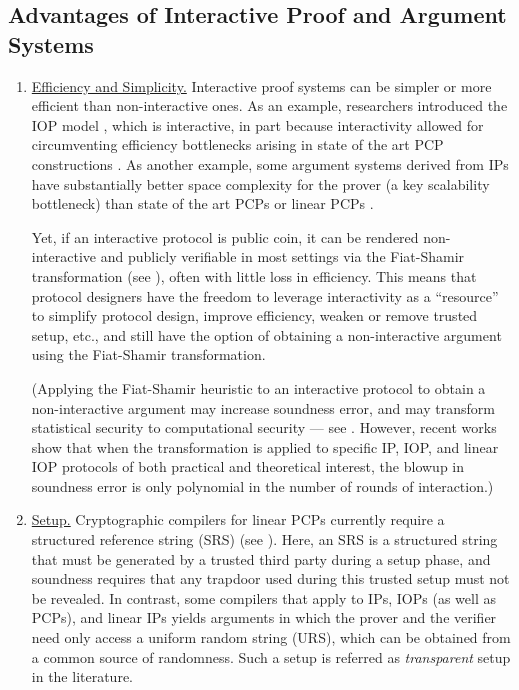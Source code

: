 \subsection{Advantages of Interactive Proof and Argument Systems}
\label{sec:paradigms:interactivity:advantages}
\begin{enumerate}[label=\alph*.]
\item \underline{Efficiency and Simplicity.} 
Interactive proof systems can be simpler or more efficient than non-interactive ones.
As an example, researchers introduced the IOP model \cite{2016:tcc:IOPs, 2016:stoc:Constant-round-Interactive-Proofs-for-Delegating-Computation}, which is interactive, in part because interactivity allowed for circumventing efficiency bottlenecks arising
in state of the art PCP constructions \cite{2013:STOC:concrete-efficiency-PCPs}. 
As another example, some argument systems derived from IPs \cite{2018:SP:Doubly-efficient-zkSNARKs-without-trusted-setup, 2019:crypto:libra}
have substantially better space complexity for the prover (a key scalability bottleneck) than state of the art PCPs \cite{2013:STOC:concrete-efficiency-PCPs} or linear PCPs \cite{2013:QSPs-and-succinct-NIZKs-without-PCPs, 2016:Eurocrypt:On-the-Size-of-Pairing-Based-Non-interactive-Arguments}. 

Yet, if an interactive protocol is public coin, it can be rendered non-interactive and publicly verifiable in most settings via the Fiat-Shamir transformation (see ), often with little loss in efficiency. This means that protocol designers have the freedom to leverage interactivity as a ``resource'' to simplify protocol design, improve efficiency, weaken or remove trusted setup, etc., and still have the option of obtaining a non-interactive argument using the Fiat-Shamir transformation.

(Applying the Fiat-Shamir heuristic to an interactive protocol to obtain a non-interactive argument may increase soundness error, and may transform statistical security to computational security --- see .
However, recent works \cite{2016:tcc:IOPs, 2019:STC:Fiat-Shamir-from-practice-to-theory} show that when the transformation is applied to specific IP, IOP, and linear IOP protocols of both practical and theoretical interest, the blowup in soundness error is only polynomial in the number of rounds of interaction.) 


\item \underline{Setup.} 
Cryptographic compilers for linear PCPs currently require a structured reference string (SRS) (see ). 
Here, an SRS is a structured string that must be generated by a trusted third party during a setup phase, and soundness requires that any
trapdoor used during this trusted setup must not be revealed. In contrast, some compilers that apply to IPs, IOPs (as well as PCPs), and linear IPs
yields arguments in which the prover and the verifier need only access a uniform random string (URS), which can be obtained
from a common source of randomness. Such a setup is referred as \emph{transparent} setup in the literature.


\end{enumerate}
